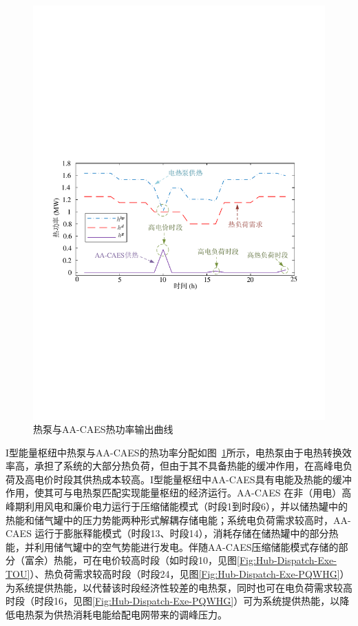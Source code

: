 \begin{figure}[H]
\centering
\includegraphics[scale=0.70]{figures/Chap4-15-Hub-Dispatch-Exe-H-gen-V2.pdf}
\caption{热泵与AA-CAES热功率输出曲线}
\label{Fig:Hub-Dispatch-Exe-H-gen}
\end{figure}

I型能量枢纽中热泵与AA-CAES的热功率分配如图~\ref{Fig:Hub-Dispatch-Exe-H-gen}所示，电热泵由于电热转换效率高，承担了系统的大部分热负荷，但由于其不具备热能的缓冲作用，在高峰电负荷及高电价时段其供热成本较高。I型能量枢纽中AA-CAES具有电能及热能的缓冲作用，使其可与电热泵匹配实现能量枢纽的经济运行。AA-CAES 在非（用电）高峰期利用风电和廉价电力运行于压缩储能模式（时段1到时段6），并以储热罐中的热能和储气罐中的压力势能两种形式解耦存储电能；系统电负荷需求较高时，AA-CAES 运行于膨胀释能模式（时段13、时段14），消耗存储在储热罐中的部分热能，并利用储气罐中的空气势能进行发电。伴随AA-CAES压缩储能模式存储的部分（富余）热能，可在电价较高时段（如时段10，见图\ref{Fig:Hub-Dispatch-Exe-TOU}）、热负荷需求较高时段（时段24，见图\ref{Fig:Hub-Dispatch-Exe-PQWHG}）为系统提供热能，以代替该时段经济性较差的电热泵，同时也可在电负荷需求较高时段（时段16，见图\ref{Fig:Hub-Dispatch-Exe-PQWHG}）可为系统提供热能，以降低电热泵为供热消耗电能给配电网带来的调峰压力。

